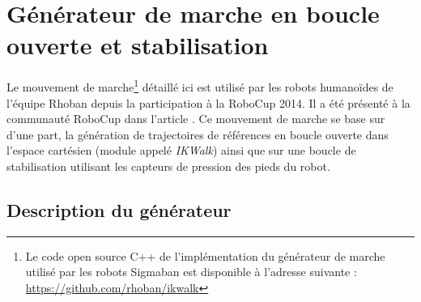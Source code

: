 
\section{Générateur de marche en boucle ouverte et stabilisation\label{sec:walk}}

Le mouvement de marche\footnote{Le code open source C++ 
de l'implémentation du générateur de marche utilisé par les robots Sigmaban
est disponible à l'adresse suivante : \url{https://github.com/rhoban/ikwalk}}
détaillé ici est utilisé par les robots humanoïdes de l'équipe Rhoban 
depuis la participation à la RoboCup 2014.
Il a été présenté à la communauté RoboCup dans 
l'article \cite{ProjectsWorkshopHumanoids2015}.
Ce mouvement de marche se base sur d'une part, la génération de trajectoires
de références en boucle ouverte dans l'espace cartésien (module appelé \textit{IKWalk})
ainsi que sur une boucle de stabilisation utilisant les capteurs
de pression des pieds du robot.

\subsection{Description du générateur}

